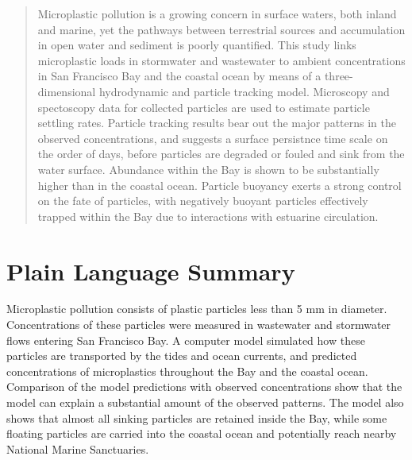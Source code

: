 \documentclass[draft]{jgr/agujournal2019}
\begin{document}
\begin{abstract}
  Microplastic pollution is a growing concern in surface waters, both
  inland and marine, yet the pathways between terrestrial sources and
  accumulation in open water and sediment is poorly quantified. This
  study links microplastic loads in stormwater and wastewater to
  ambient concentrations in San Francisco Bay and the coastal ocean by
  means of a three-dimensional hydrodynamic and particle tracking
  model.  Microscopy and spectoscopy data for collected particles are
  used to estimate particle settling rates. Particle tracking results
  bear out the major patterns in the observed concentrations, and
  suggests a surface persistnce time scale on the order of days,
  before particles are degraded or fouled and sink from the water
  surface. Abundance within the Bay is shown to be substantially
  higher than in the coastal ocean.  Particle buoyancy exerts a strong
  control on the fate of particles, with negatively buoyant particles
  effectively trapped within the Bay due to interactions with
  estuarine circulation.
\end{abstract}

\section*{Plain Language Summary}
Microplastic pollution consists of plastic particles less than 5 mm in
diameter. Concentrations of these particles were measured in
wastewater and stormwater flows entering San Francisco Bay. A computer
model simulated how these particles are transported by the tides and
ocean currents, and predicted concentrations of microplastics
throughout the Bay and the coastal ocean. Comparison of the model predictions
with observed concentrations show that the model can explain a substantial
amount of the observed patterns. The model also shows that almost all
sinking particles are retained inside the Bay, while some floating particles
are carried into the coastal ocean and potentially reach nearby
National Marine Sanctuaries.

%
%

%
\end{document}
